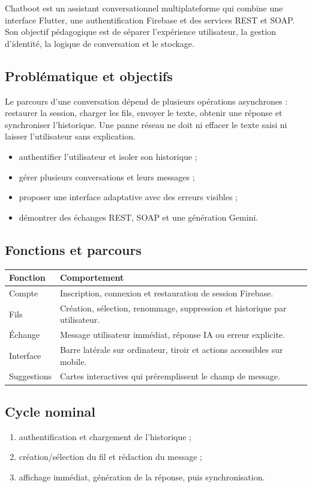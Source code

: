 \documentclass[10pt,a4paper]{article}
\begin{document}
Chatboot est un assistant conversationnel multiplateforme qui combine une interface Flutter, une authentification Firebase et des services REST et SOAP. Son objectif pédagogique est de séparer l'expérience utilisateur, la gestion d'identité, la logique de conversation et le stockage.

\subsection*{Problématique et objectifs}
Le parcours d'une conversation dépend de plusieurs opérations asynchrones : restaurer la session, charger les fils, envoyer le texte, obtenir une réponse et synchroniser l'historique. Une panne réseau ne doit ni effacer le texte saisi ni laisser l'utilisateur sans explication.
\begin{itemize}
  \item authentifier l'utilisateur et isoler son historique ;
  \item gérer plusieurs conversations et leurs messages ;
  \item proposer une interface adaptative avec des erreurs visibles ;
  \item démontrer des échanges REST, SOAP et une génération Gemini.
\end{itemize}

\subsection*{Fonctions et parcours}
\begin{tabularx}{\textwidth}{@{}p{}X@{}}
\toprule
\textbf{Fonction} & \textbf{Comportement} \\
\midrule
Compte & Inscription, connexion et restauration de session Firebase. \\
Fils & Création, sélection, renommage, suppression et historique par utilisateur. \\
Échange & Message utilisateur immédiat, réponse IA ou erreur explicite. \\
Interface & Barre latérale sur ordinateur, tiroir et actions accessibles sur mobile. \\
Suggestions & Cartes interactives qui préremplissent le champ de message. \\
\bottomrule
\end{tabularx}

\subsection*{Cycle nominal}
\begin{enumerate}
  \item authentification et chargement de l'historique ;
  \item création/sélection du fil et rédaction du message ;
  \item affichage immédiat, génération de la réponse, puis synchronisation.
\end{enumerate}
\end{document}
